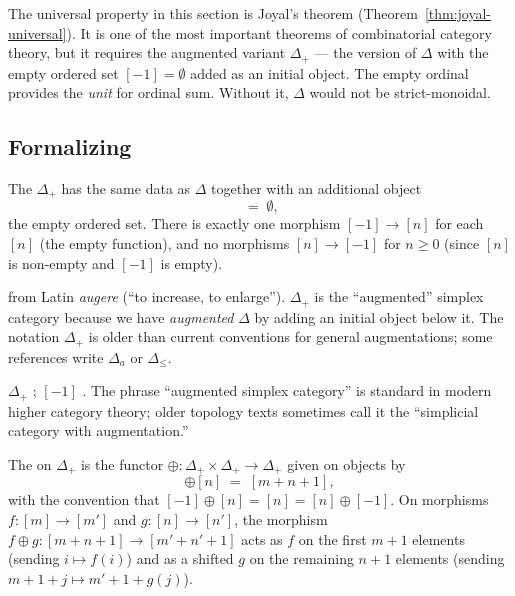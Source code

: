 \begin{readernote}
The universal property in this section is Joyal's theorem
(Theorem~\ref{thm:joyal-universal}). It is one of the most important
theorems of combinatorial category theory, but it requires the
augmented variant $\Delta_+$ — the version of $\Delta$ with the empty
ordered set $[-1] = \emptyset$ added as an initial object. The empty
ordinal provides the \emph{unit} for ordinal sum. Without it, $\Delta$
would not be strict-monoidal.
\end{readernote}

\subsection{Formalizing}

\begin{definition}
\label{def:augmented-delta}
The  $\Delta_+$ has the same data as
$\Delta$ together with an additional object
\begin{equation*}
  [-1] \;=\; \emptyset,
\end{equation*}
the empty ordered set. There is exactly one morphism $[-1] \to [n]$ for
each $[n]$ (the empty function), and no morphisms $[n] \to [-1]$ for
$n \geq 0$ (since $[n]$ is non-empty and $[-1]$ is empty).
\end{definition}

\begin{nameorigin}
 from Latin \emph{augere} (``to increase, to enlarge'').
$\Delta_+$ is the ``augmented'' simplex category because we have
\emph{augmented} $\Delta$ by adding an initial object below it. The
notation $\Delta_+$ is older than current conventions for general
augmentations; some references write $\Delta_a$ or $\Delta_{\leq}$.
\end{nameorigin}

\begin{howtosay}
$\Delta_+$ ; $[-1]$
. The phrase
``augmented simplex category'' is standard in modern higher category
theory; older topology texts sometimes call it the ``simplicial category
with augmentation.''
\end{howtosay}

\begin{definition}
\label{def:ordinal-sum}
The  on $\Delta_+$ is the functor
$\oplus : \Delta_+ \times \Delta_+ \to \Delta_+$ given on objects by
\begin{equation*}
  [m] \oplus [n] \;=\; [m + n + 1],
\end{equation*}
with the convention that $[-1] \oplus [n] = [n] = [n] \oplus [-1]$. On
morphisms $f : [m] \to [m']$ and $g : [n] \to [n']$, the morphism
$f \oplus g : [m + n + 1] \to [m' + n' + 1]$ acts as $f$ on the first
$m + 1$ elements (sending $i \mapsto f(i)$) and as a shifted $g$ on the
remaining $n + 1$ elements (sending $m + 1 + j \mapsto m' + 1 + g(j)$).
\end{definition}

